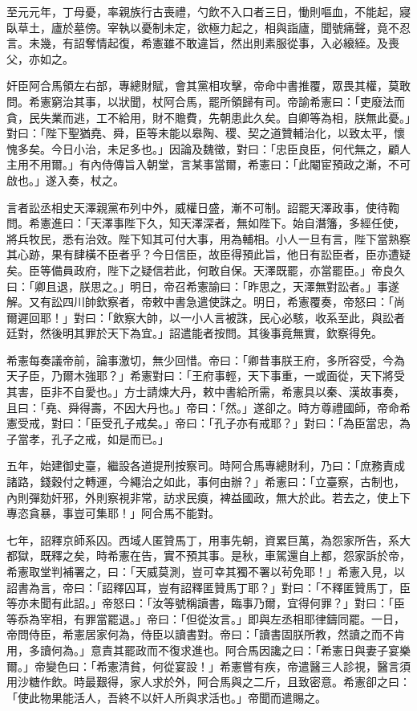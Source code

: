 \begin{pinyinscope}
 至元元年，丁母憂，率親族行古喪禮，勺飲不入口者三日，慟則嘔血，不能起，寢臥草土，廬於墓傍。宰執以憂制未定，欲極力起之，相與詣廬，聞號痛聲，竟不忍言。未幾，有詔奪情起復，希憲雖不敢違旨，然出則素服從事，入必縗絰。及喪父，亦如之。



 奸臣阿合馬領左右部，專總財賦，會其黨相攻擊，帝命中書推覆，眾畏其權，莫敢問。希憲窮治其事，以狀聞，杖阿合馬，罷所領歸有司。帝諭希憲曰：「吏廢法而貪，民失業而逃，工不給用，財不贍費，先朝患此久矣。自卿等為相，朕無此憂。」對曰：「陛下聖猶堯、舜，臣等未能以皋陶、稷、契之道贊輔治化，以致太平，懷愧多矣。今日小治，未足多也。」因論及魏徵，對曰：「忠臣良臣，何代無之，顧人主用不用爾。」有內侍傳旨入朝堂，言某事當爾，希憲曰：「此閹宦預政之漸，不可啟也。」遂入奏，杖之。



 言者訟丞相史天澤親黨布列中外，威權日盛，漸不可制。詔罷天澤政事，使待鞫問。希憲進曰：「天澤事陛下久，知天澤深者，無如陛下。始自潛籓，多經任使，將兵牧民，悉有治效。陛下知其可付大事，用為輔相。小人一旦有言，陛下當熟察其心跡，果有肆橫不臣者乎？今日信臣，故臣得預此旨，他日有訟臣者，臣亦遭疑矣。臣等備員政府，陛下之疑信若此，何敢自保。天澤既罷，亦當罷臣。」帝良久曰：「卿且退，朕思之。」明日，帝召希憲諭曰：「昨思之，天澤無對訟者。」事遂解。又有訟四川帥欽察者，帝敕中書急遣使誅之。明日，希憲覆奏，帝怒曰：「尚爾遲回耶！」對曰：「飲察大帥，以一小人言被誅，民心必駭，收系至此，與訟者廷對，然後明其罪於天下為宜。」詔遣能者按問。其後事竟無實，欽察得免。



 希憲每奏議帝前，論事激切，無少回惜。帝曰：「卿昔事朕王府，多所容受，今為天子臣，乃爾木強耶？」希憲對曰：「王府事輕，天下事重，一或面從，天下將受其害，臣非不自愛也。」方士請煉大丹，敕中書給所需，希憲具以秦、漢故事奏，且曰：「堯、舜得壽，不因大丹也。」帝曰：「然。」遂卻之。時方尊禮國師，帝命希憲受戒，對曰：「臣受孔子戒矣。」帝曰：「孔子亦有戒耶？」對曰：「為臣當忠，為子當孝，孔子之戒，如是而已。」



 五年，始建御史臺，繼設各道提刑按察司。時阿合馬專總財利，乃曰：「庶務責成諸路，錢穀付之轉運，今繩治之如此，事何由辦？」希憲曰：「立臺察，古制也，內則彈劾奸邪，外則察視非常，訪求民瘼，裨益國政，無大於此。若去之，使上下專恣貪暴，事豈可集耶！」阿合馬不能對。



 七年，詔釋京師系囚。西域人匿贊馬丁，用事先朝，資累巨萬，為怨家所告，系大都獄，既釋之矣，時希憲在告，實不預其事。是秋，車駕還自上都，怨家訴於帝，希憲取堂判補署之，曰：「天威莫測，豈可幸其獨不署以茍免耶！」希憲入見，以詔書為言，帝曰：「詔釋囚耳，豈有詔釋匿贊馬丁耶？」對曰：「不釋匿贊馬丁，臣等亦未聞有此詔。」帝怒曰：「汝等號稱讀書，臨事乃爾，宜得何罪？」對曰：「臣等忝為宰相，有罪當罷退。」帝曰：「但從汝言。」即與左丞相耶律鑄同罷。一日，帝問侍臣，希憲居家何為，侍臣以讀書對。帝曰：「讀書固朕所教，然讀之而不肯用，多讀何為。」意責其罷政而不復求進也。阿合馬因讒之曰：「希憲日與妻子宴樂爾。」帝變色曰：「希憲清貧，何從宴設！」希憲嘗有疾，帝遣醫三人診視，醫言須用沙糖作飲。時最艱得，家人求於外，阿合馬與之二斤，且致密意。希憲卻之曰：「使此物果能活人，吾終不以奸人所與求活也。」帝聞而遣賜之。




\end{pinyinscope}
